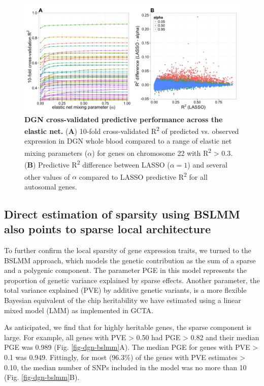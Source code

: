 \documentclass[10pt,letterpaper]{article}
\begin{document}
\begin{figure}[h]
\includegraphics[width=12cm]{Figures/Fig-DGN-EN.png}
\caption{{\bf DGN cross-validated predictive performance across the elastic net.} 
(\textbf{A}) 10-fold cross-validated R\textsuperscript{2} of
predicted vs. observed expression in DGN whole blood compared to a range
of elastic net mixing parameters (\(\alpha\)) for genes on chromosome 22
with R\textsuperscript{2} \textgreater{} 0.3. (\textbf{B}) Predictive
R\textsuperscript{2} difference between LASSO (\(\alpha = 1\)) and
several other values of \(\alpha\) compared to LASSO predictive
R\textsuperscript{2} for all autosomal genes.}
\label{fig-dgn-en}
\end{figure}

\subsection*{Direct estimation of sparsity using BSLMM also points to sparse local architecture}

To further confirm the local sparsity of gene expression traits, we turned to the BSLMM \cite{Zhou_2013} approach, which models the genetic contribution as the sum of a sparse and a polygenic component. The parameter PGE in this model represents the proportion of genetic variance explained by sparse effects. Another parameter, the total variance explained (PVE) by additive genetic variants, is a more flexible Bayesian equivalent of the chip heritability we have estimated using a linear mixed model (LMM) as implemented in GCTA. 

As anticipated, we find that for highly heritable genes, the sparse component is large. For example, all genes with PVE \textgreater{} 0.50 had PGE \textgreater{} 0.82 and their median PGE was 0.989 (Fig. \ref{fig-dgn-bslmm}A). The median PGE for genes with PVE \textgreater{} 0.1 was 0.949. Fittingly, for most (96.3\%) of the genes with PVE estimates \textgreater{} 0.10, the median number of SNPs included in the model was no more than 10 (Fig. \ref{fig-dgn-bslmm}B).
\end{document}
